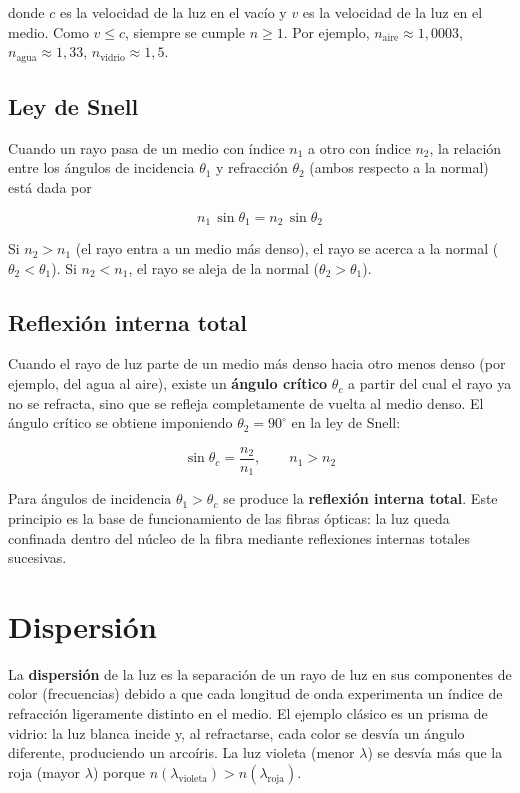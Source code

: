 donde $c$ es la velocidad de la luz en el vacío y $v$ es la velocidad de la luz en el medio. Como $v \leq c$, siempre se cumple $n \geq 1$. Por ejemplo, $n_{\text{aire}}\approx1{,}0003$, $n_{\text{agua}}\approx1{,}33$, $n_{\text{vidrio}}\approx1{,}5$.

\subsection{Ley de Snell}

Cuando un rayo pasa de un medio con índice $n_1$ a otro con índice $n_2$, la relación entre los ángulos de incidencia $\theta_1$ y refracción $\theta_2$ (ambos respecto a la normal) está dada por

$$n_1\,\sin\theta_1 = n_2\,\sin\theta_2$$

Si $n_2 > n_1$ (el rayo entra a un medio más denso), el rayo se acerca a la normal ($\theta_2 < \theta_1$). Si $n_2 < n_1$, el rayo se aleja de la normal ($\theta_2 > \theta_1$).



\subsection{Reflexión interna total}

Cuando el rayo de luz parte de un medio más denso hacia otro menos denso (por ejemplo, del agua al aire), existe un \textbf{ángulo crítico} $\theta_c$ a partir del cual el rayo ya no se refracta, sino que se refleja completamente de vuelta al medio denso. El ángulo crítico se obtiene imponiendo $\theta_2=90^\circ$ en la ley de Snell:

$$\sin\theta_c = \frac{n_2}{n_1}, \qquad n_1 > n_2$$

Para ángulos de incidencia $\theta_1 > \theta_c$ se produce la \textbf{reflexión interna total}. Este principio es la base de funcionamiento de las fibras ópticas: la luz queda confinada dentro del núcleo de la fibra mediante reflexiones internas totales sucesivas.



\section{Dispersión}

La \textbf{dispersión} de la luz es la separación de un rayo de luz en sus componentes de color (frecuencias) debido a que cada longitud de onda experimenta un índice de refracción ligeramente distinto en el medio. El ejemplo clásico es un prisma de vidrio: la luz blanca incide y, al refractarse, cada color se desvía un ángulo diferente, produciendo un arcoíris. La luz violeta (menor $\lambda$) se desvía más que la roja (mayor $\lambda$) porque $n(\lambda_{\text{violeta}}) > n(\lambda_{\text{roja}})$.

